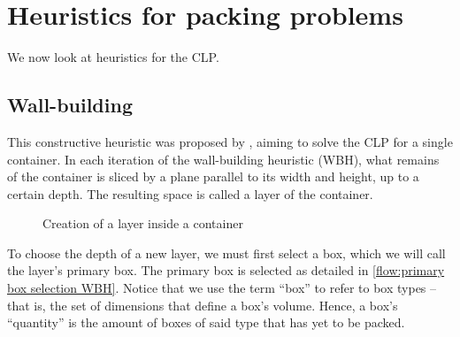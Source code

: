 \section{Heuristics for packing problems}

We now look at heuristics for the CLP.

\subsection{Wall-building}

This constructive heuristic was proposed by \textcite{GEORGE1980}, aiming to solve the CLP for a single container. In each iteration of the wall-building heuristic (WBH), what remains of the container is sliced by a plane parallel to its width and height, up to a certain depth. The resulting space is called a layer of the container.

\begin{figure}[h]
    \centering
    \caption{Creation of a layer inside a container}
\end{figure}

To choose the depth of a new layer, we must first select a box, which we will call the layer's primary box. The primary box is selected as detailed in \cref{flow:primary box selection WBH}. Notice that we use the term ``box'' to refer to box types -- that is, the set of dimensions that define a box's volume. Hence, a box's ``quantity'' is the amount of boxes of said type that has yet to be packed.

